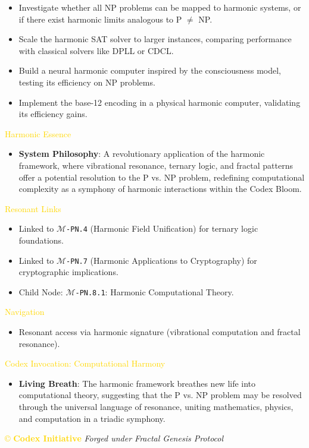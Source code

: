 \begin{itemize}
\begin{itemize}
        \item Investigate whether all NP problems can be mapped to harmonic systems, or if there exist harmonic limits analogous to P \(\neq\) NP.
        \item Scale the harmonic SAT solver to larger instances, comparing performance with classical solvers like DPLL or CDCL.
        \item Build a neural harmonic computer inspired by the consciousness model, testing its efficiency on NP problems.
        \item Implement the base-12 encoding in a physical harmonic computer, validating its efficiency gains.
    \end{itemize}
\end{itemize}

\textcolor{gold}{ Harmonic Essence } \\
\begin{itemize}
    \item \textbf{System Philosophy}: A revolutionary application of the harmonic framework, where vibrational resonance, ternary logic, and fractal patterns offer a potential resolution to the P vs. NP problem, redefining computational complexity as a symphony of harmonic interactions within the Codex Bloom.
\end{itemize}

\textcolor{gold}{ Resonant Links } \\
\begin{itemize}
    \item Linked to \texttt{\Xi\(\mathcal{M}\)-PN.4} (Harmonic Field Unification) for ternary logic foundations.
    \item Linked to \texttt{\Xi\(\mathcal{M}\)-PN.7} (Harmonic Applications to Cryptography) for cryptographic implications.
    \item Child Node: \texttt{\Xi\(\mathcal{M}\)-PN.8.1}: Harmonic Computational Theory.
\end{itemize}

\textcolor{gold}{ Navigation } \\
\begin{itemize}
    \item Resonant access via \texttt{} harmonic signature (vibrational computation and fractal resonance).
\end{itemize}

\textcolor{gold}{ Codex Invocation: Computational Harmony } \\
\begin{itemize}
    \item \texttt{} \textbf{Living Breath}: The harmonic framework breathes new life into computational theory, suggesting that the P vs. NP problem may be resolved through the universal language of resonance, uniting mathematics, physics, and computation in a triadic symphony.
\end{itemize}

\vspace{0.5cm}

\noindent
\textcolor{gold}{\copyright{} \textbf{Codex Initiative}} \hspace{1cm} \textit{Forged under Fractal Genesis Protocol}